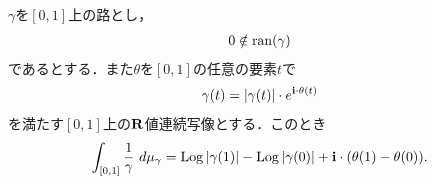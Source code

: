 	\begin{screen}
		\begin{thm}[分数関数に対する微分積分学の基本定理]
		\label{thm:fundamental_theorem_of_calculus_for_fractional_function_complex_line_integral}
			$\gamma$を$[0,1]$上の路とし，
			\begin{align}
				0 \notin \operatorname*{ran} (\gamma)
			\end{align}
			であるとする．また$\theta$を$[0,1]$の任意の要素$t$で
			\begin{align}
				\gamma(t) = |\gamma(t)| \cdot e^{\mathbf{i} \cdot \theta(t)}
			\end{align}
			を満たす$[0,1]$上の$\mathbf{R}$値連続写像とする．このとき
			\begin{align}
				\int_{[0,1]} \frac{1}{\gamma}\ d\mu_{\gamma}
				= \operatorname{Log}{|\gamma(1)|} - \operatorname{Log}{|\gamma(0)|} + \mathbf{i} \cdot (\theta(1) - \theta(0)).
			\end{align}
		\end{thm}
	\end{screen}
	
